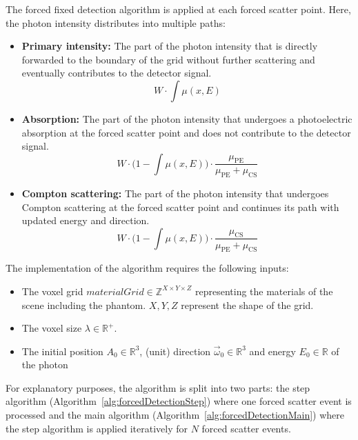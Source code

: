 The forced fixed detection algorithm is applied at each forced scatter point.
Here, the photon intensity distributes into multiple paths: 
\begin{itemize}
    \item \textbf{Primary intensity:} The part of the photon intensity that is directly forwarded to the boundary of the grid without further scattering and eventually contributes to the detector signal. $$ W \cdot \int \mu(x,E) $$
    \item \textbf{Absorption:} The part of the photon intensity that undergoes a photoelectric absorption at the forced scatter point and does not contribute to the detector signal. $$W \cdot \big(1 - \int \mu(x,E) \big) \cdot \frac{\mu_\textrm{PE}}{\mu_\textrm{PE}+\mu_\textrm{CS}}$$
    \item \textbf{Compton scattering:} The part of the photon intensity that undergoes Compton scattering at the forced scatter point and continues its path with updated energy and direction. $$W \cdot \big(1 - \int \mu(x,E) \big) \cdot \frac{\mu_\textrm{CS}}{\mu_\textrm{PE}+\mu_\textrm{CS}}$$
\end{itemize}

The implementation of the algorithm requires the following inputs:
\begin{itemize}
    \item The voxel grid $materialGrid \in \mathbb{Z}^{X \times Y \times Z}$
    representing the materials of the scene including the phantom. $X,Y,Z$ represent
    the shape of the grid.
    \item The voxel size $\lambda \in \mathbb{R}^+$.
    \item The initial position $A_0 \in \mathbb{R}^3$, (unit) direction $\vec{\omega}_0 \in \mathbb{R}^3$ and energy $E_0 \in \mathbb{R}$ of the photon
\end{itemize}

For explanatory purposes, the algorithm is split into two parts: the step
algorithm (Algorithm~\ref{alg:forcedDetectionStep}) where one forced scatter
event is processed and the main algorithm
(Algorithm~\ref{alg:forcedDetectionMain}) where the step algorithm is applied
iteratively for $N$ forced scatter events.

